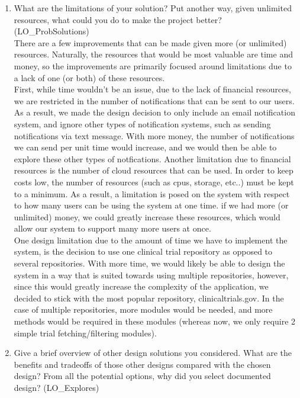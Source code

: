 \documentclass[12pt, titlepage]{article}
\begin{document}
\begin{enumerate}
  \item What are the limitations of your solution?  Put another way, given
  unlimited resources, what could you do to make the project better? (LO\_ProbSolutions)\\

  There are a few improvements that can be made given more (or unlimited) resources. Naturally, the resources that 
  would be most valuable are time and money, so the improvements are primarily focused around limitations due to a lack of 
  one (or both) of these resources.\\

  First, while time wouldn't be an issue, due to the lack of financial resources, we are restricted in the number of notifications that 
  can be sent to our users. As a result, we made the design decision to only include an email notification system, and ignore other types 
  of notification systems, such as sending notifications via text message. With more money, the number of notifications we can send per unit time 
  would increase, and we would then be able to explore these other types of notfications. Another limitation due to financial resources
  is the number of cloud resources that can be used. In order to keep costs low, the number of resources (such as cpus, storage, etc..) must 
  be kept to a minimum. As a result, a limitation is posed on the system with respect to how many users can be using the system at one time. if we had 
  more (or unlimited) money, we could greatly increase these resources, which would allow our system to support many more users at once.\\
  
  One design limitation due to the amount of time we have to implement the system, is the decision to use one clinical trial repository as 
  opposed to several repositories. With more time, we would likely be able to design the system in a way that is suited towards using 
  multiple repositories, however, since this would greatly increase the complexity of the application, we decided to stick with the most 
  popular repository, clinicaltrials.gov. In the case of multiple repositories, more modules would be needed, and more methods would be required 
  in these modules (whereas now, we only require 2 simple trial fetching/filtering modules).

  \item Give a brief overview of other design solutions you considered.  What
  are the benefits and tradeoffs of those other designs compared with the chosen
  design?  From all the potential options, why did you select documented design?
  (LO\_Explores)\\


\end{enumerate}
\end{document}
